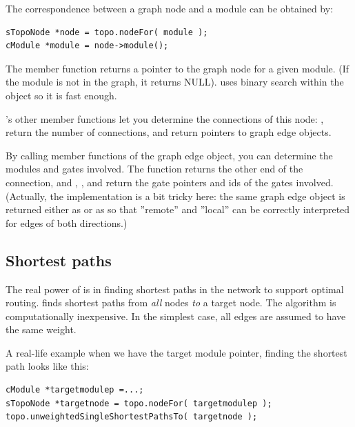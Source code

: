 The correspondence between a graph node and a module can be obtained 
by:

\begin{Verbatim}
sTopoNode *node = topo.nodeFor( module );
cModule *module = node->module();
\end{Verbatim}


The  member function returns a pointer to the graph
node for a given module. (If the module is not in the graph, it
returns NULL).  uses binary search within the
 object so it is fast enough.


's other member functions let you determine the
connections of this node: ,  return
the number of connections,  and
 return pointers to graph edge objects.


By calling member functions of the graph edge object, you can
determine the modules and gates involved. The 
function returns the other end of the connection, and
, ,  and
 return the gate pointers and ids of the gates
involved. (Actually, the implementation is a bit tricky here: the same
graph edge object  is returned either as
 or as  so that ''remote''
and ''local'' can be correctly interpreted for edges of both
directions.)





\subsection{Shortest paths}

The real power of  is in finding shortest
paths in the network to support optimal
routing.  finds shortest paths
from \textit{all} nodes \textit{to} a target node. The algorithm is
computationally inexpensive. In the simplest case, all edges are
assumed to have the same weight.

A real-life example when we have the target module pointer, finding 
the shortest path looks like this:

\begin{Verbatim}
cModule *targetmodulep =...;
sTopoNode *targetnode = topo.nodeFor( targetmodulep );
topo.unweightedSingleShortestPathsTo( targetnode );
\end{Verbatim}



